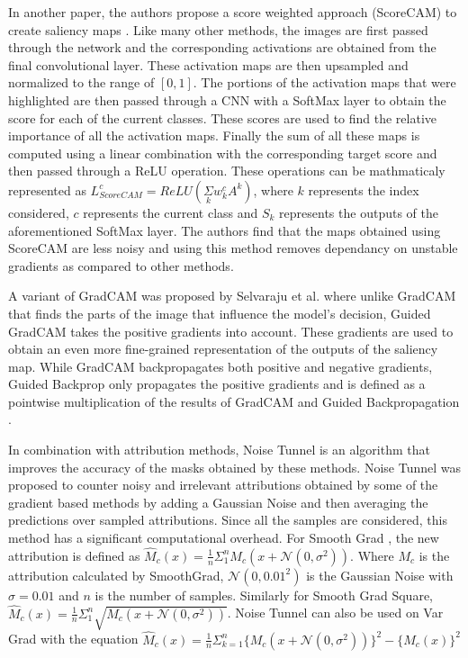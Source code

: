 In another paper, the authors propose a score weighted approach (ScoreCAM) to create saliency maps \cite{wangScoreCAMScoreWeightedVisual2020}. Like many other methods, the images are first passed through the network and the corresponding activations are obtained from the final convolutional layer. These activation maps are then upsampled and normalized to the range of $[0,1]$. The portions of the activation maps that were highlighted are then passed through a CNN with a SoftMax layer to obtain the score for each of the current classes. These scores are used to find the relative importance of all the activation maps. Finally the sum of all these maps is computed using a linear combination with the corresponding target score and then passed through a ReLU operation. These operations can be mathmaticaly represented as $L^{c}_{ScoreCAM} = ReLU(\underset{k}\Sigma w_{k}^{c}A^{k})$, where $k$ represents the index considered, $c$ represents the current class and $S_k$ represents the outputs of the aforementioned SoftMax layer. The authors find that the maps obtained using ScoreCAM are less noisy and using this method removes dependancy on unstable gradients as compared to other methods.

A variant of GradCAM \cite{selvarajuGradCAMVisualExplanations} was proposed by Selvaraju et al. \cite{selvarajuGradCAMWhyDid2017} where unlike GradCAM that finds the parts of the image that influence the model's decision, Guided GradCAM takes the positive gradients into account. These gradients are used to obtain an even more fine-grained representation of the outputs of the saliency map. While GradCAM backpropagates both positive and negative gradients, Guided Backprop only propagates the positive gradients and is defined as a pointwise multiplication of the results of GradCAM and Guided Backpropagation \cite{springenbergStrivingSimplicityAll2015}.

In combination with attribution methods, Noise Tunnel \cite{kokhlikyanCaptumUnifiedGeneric2020} is an algorithm that improves the accuracy of the masks obtained by these methods. Noise Tunnel was proposed to counter noisy and irrelevant attributions obtained by some of the gradient based methods by adding a Gaussian Noise and then averaging the predictions over sampled attributions. Since all the samples are considered, this method has a significant computational overhead. For Smooth Grad \cite{smilkovSmoothGradRemovingNoise2017}, the new attribution is defined as $\hat M_{c}(x) = \frac{1}{n}\Sigma_{1}^{n}M_{c}(x + \mathcal{N}(0, \sigma^{2}))$. Where $M_{c}$ is the attribution calculated by SmoothGrad, $\mathcal {N}(0, 0.01^2)$ is the Gaussian Noise with $\sigma = 0.01$ and $n$ is the number of samples. Similarly for Smooth Grad Square, $\hat M_{c}(x) = \frac{1}{n}\Sigma_{1}^{n}\sqrt{M_{c}(x + \mathcal{N}(0, \sigma^{2}))}$. Noise Tunnel can also be used on Var Grad \cite{richterVarGradLowVarianceGradient2020} with the equation $\hat M_{c}(x) = \frac{1}{n}\Sigma_{k=1}^{n}\{M_{c}(x + \mathcal{N}(0, \sigma^{2}))\}^{2}- \{\hat M_{c}(x)\}^{2}$

